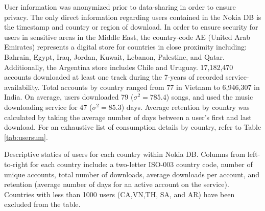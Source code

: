 \documentclass[a4paper]{article}
\begin{document}
User information was anonymized prior to data-sharing in order to ensure privacy. The only direct information regarding users contained in the Nokia DB is the timestamp and country or region of download. In order to ensure security for users in sensitive areas in the Middle East, the country-code AE (United Arab Emirates) represents a digital store for countries in close proximity including: Bahrain, Egypt, Iraq, Jordan, Kuwait, Lebanon, Palestine, and Qatar. Additionally, the Argentina store includes Chile and Uruguay. 17,182,470 accounts downloaded at least one track during the 7-years of recorded service-availability. Total accounts by country ranged from 77 in Vietnam to 6,946,307 in India. On average, users downloaded 79 ($\sigma^2 = 785.4$) songs, and used the music downloading service for 47 ($\sigma^2 = 85.3$) days. Average retention by country was calculated by taking the average number of days between a user's first and last download. For an exhaustive list of consumption details by country, refer to Table \ref{tab:usersum}.

\begin{table}[h!]
\centering
{}%
{\csvlinetotablerow}%
\caption[User Summary Table]{Descriptive statics of users for each country within Nokia DB. Columns from left-to-right for each country include: a two-letter ISO-003 country code, number of unique accounts, total number of downloads, average downloads per account, and retention (average number of days for an active account on the service). Countries with less than 1000 users (CA,VN,TH, SA, and AR) have been excluded from the table.}\label{tab:usersum}
\end{table}
\end{document}
